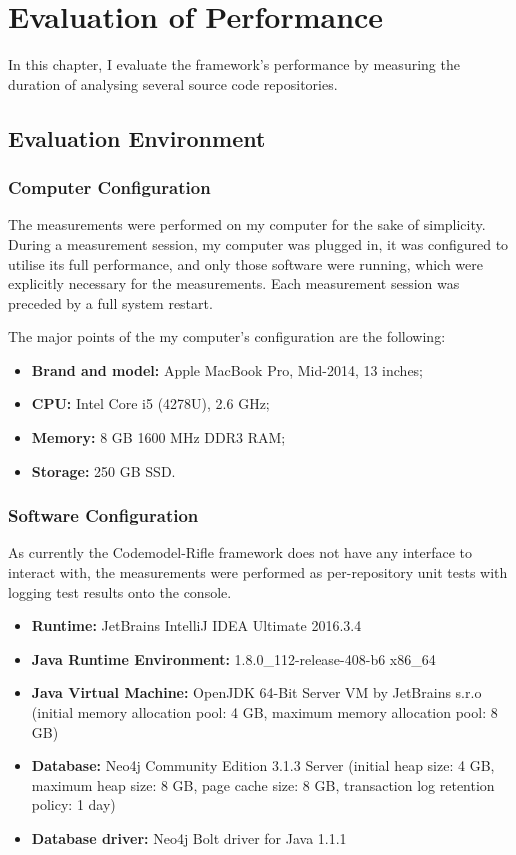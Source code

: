 \chapter{Evaluation of Performance}
\label{chapter:evaluation}

In this chapter, I evaluate the framework's performance by measuring the duration of analysing several source code repositories.


\section{Evaluation Environment}

\subsection{Computer Configuration}

The measurements were performed on my computer for the sake of simplicity. During a measurement session, my computer was plugged in, it was configured to utilise its full performance, and only those software were running, which were explicitly necessary for the measurements. Each measurement session was preceded by a full system restart.

The major points of the my computer's configuration are the following:

\begin{itemize}
\item \textbf{Brand and model:} Apple MacBook Pro, Mid-2014, 13 inches;
\item \textbf{CPU:} Intel Core i5 (4278U), 2.6 GHz;
\item \textbf{Memory:} 8 GB 1600 MHz DDR3 RAM;
\item \textbf{Storage:} 250 GB SSD.
\end{itemize}


\subsection{Software Configuration}

As currently the Codemodel-Rifle framework does not have any interface to interact with, the measurements were performed as per-repository unit tests with logging test results onto the console.

\begin{itemize}
\item \textbf{Runtime:} JetBrains IntelliJ IDEA Ultimate 2016.3.4
\item \textbf{Java Runtime Environment:} 1.8.0\_112-release-408-b6 x86\_64
\item \textbf{Java Virtual Machine:} OpenJDK 64-Bit Server VM by JetBrains s.r.o (initial memory allocation pool: 4 GB, maximum memory allocation pool: 8 GB)
\item \textbf{Database:} Neo4j Community Edition 3.1.3 Server (initial heap size: 4 GB, maximum heap size: 8 GB, page cache size: 8 GB, transaction log retention policy: 1 day)
\item \textbf{Database driver:} Neo4j Bolt driver for Java 1.1.1
\end{itemize}

